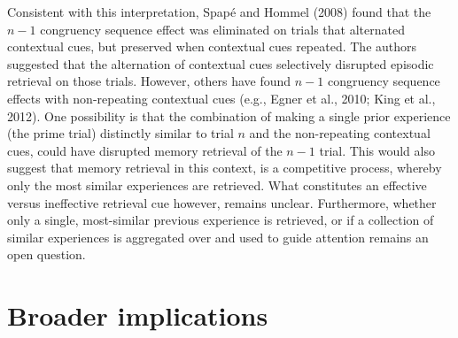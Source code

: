 \documentclass[]{DissertateCUNY}
\begin{document}
Consistent with this interpretation, Spapé and Hommel (2008) found that
the \(n-1\) congruency sequence effect was eliminated on trials that
alternated contextual cues, but preserved when contextual cues repeated.
The authors suggested that the alternation of contextual cues
selectively disrupted episodic retrieval on those trials. However,
others have found \(n-1\) congruency sequence effects with non-repeating
contextual cues (e.g., Egner et al., 2010; King et al., 2012). One
possibility is that the combination of making a single prior experience
(the prime trial) distinctly similar to trial \(n\) and the
non-repeating contextual cues, could have disrupted memory retrieval of
the \(n-1\) trial. This would also suggest that memory retrieval in this
context, is a competitive process, whereby only the most similar
experiences are retrieved. What constitutes an effective versus
ineffective retrieval cue however, remains unclear. Furthermore, whether
only a single, most-similar previous experience is retrieved, or if a
collection of similar experiences is aggregated over and used to guide
attention remains an open question.

\hypertarget{broader-implications}{%
\section{Broader implications}\label{broader-implications}}
\end{document}

